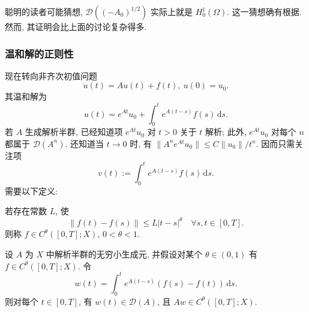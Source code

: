 \begin{Remark}
\label{rem:elliptic-square-root-dirichlet-domain}
聪明的读者可能猜想, $\mathcal{D}((-A_0)^{1/2})$ 实际上就是 $H_0^1(\Omega)$. 这一猜想确有根据. 然而, 其证明会比上面的讨论复杂得多.
\end{Remark}

\subsubsection{温和解的正则性}\label{subsec:analytic-mild-solution-regularity}

现在转向非齐次初值问题
\begin{equation}\label{eq:analytic-semigroup-inhomogeneous-mild-initial-value-problem}
\dot u(t)=Au(t)+f(t),\ u(0)=u_0.
\end{equation}
其温和解为
\begin{equation}\label{eq:analytic-semigroup-mild-solution-representation}
u(t)=e^{At}u_0+\int_0^t e^{A(t-s)}f(s)\,\mathrm{d}s.
\end{equation}
若 $A$ 生成解析半群, 已经知道项 $e^{At}u_0$ 对 $t>0$ 关于 $t$ 解析; 此外, $e^{At}u_0$ 对每个 $n$ 都属于 $\mathcal{D}(A^n)$. 还知道当 $t\to0$ 时, 有 $\|A^ne^{At}u_0\|\leq C\|u_0\|/t^n$. 因而只需关注项
\begin{equation}\label{eq:analytic-semigroup-mild-inhomogeneous-convolution}
v(t):=\int_0^t e^{A(t-s)}f(s)\,\mathrm{d}s.
\end{equation}
需要以下定义:

\begin{Definition}
\label{def:banach-valued-holder-continuity}
若存在常数 $L$, 使
\begin{equation}\label{eq:banach-valued-holder-continuity-definition}
\|f(t)-f(s)\|\leq L|t-s|^\theta\quad\forall s,t\in[0,T].
\end{equation}
则称 $f\in C^\theta([0,T];X)$, $0<\theta<1$.
\end{Definition}

\begin{Lemma}
\label{lem:analytic-holder-data-difference-convolution}
设 $A$ 为 $X$ 中解析半群的无穷小生成元, 并假设对某个 $\theta\in(0,1)$ 有 $f\in C^\theta([0,T];X)$. 令
\begin{equation}\label{eq:analytic-semigroup-holder-data-difference-convolution}
w(t)=\int_0^t e^{A(t-s)}(f(s)-f(t))\,\mathrm{d}s.
\end{equation}
则对每个 $t\in[0,T]$, 有 $w(t)\in\mathcal{D}(A)$, 且 $Aw\in C^\theta([0,T];X)$.
\end{Lemma}

